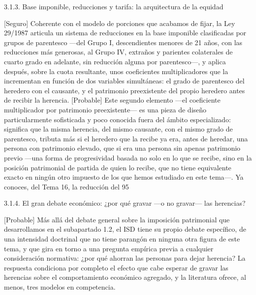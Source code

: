 \documentclass[10pt,a4paper]{article}
\begin{document}
3.1.3. Base imponible, reducciones y tarifa: la arquitectura de la equidad

[Seguro] Coherente con el modelo de porciones que acabamos de fijar, la Ley 29/1987 articula un sistema de reducciones en la base imponible clasificadas por grupos de parentesco —del Grupo I, descendientes menores de 21 años, con las reducciones más generosas, al Grupo IV, extraños y parientes colaterales de cuarto grado en adelante, sin reducción alguna por parentesco—, y aplica después, sobre la cuota resultante, unos coeficientes multiplicadores que la incrementan en función de dos variables simultáneas: el grado de parentesco del heredero con el causante, y el patrimonio preexistente del propio heredero antes de recibir la herencia. [Probable] Este segundo elemento —el coeficiente multiplicador por patrimonio preexistente— es una pieza de diseño particularmente sofisticada y poco conocida fuera del ámbito especializado: significa que la misma herencia, del mismo causante, con el mismo grado de parentesco, tributa más si el heredero que la recibe ya era, antes de heredar, una persona con patrimonio elevado, que si era una persona sin apenas patrimonio previo —una forma de progresividad basada no solo en lo que se recibe, sino en la posición patrimonial de partida de quien lo recibe, que no tiene equivalente exacto en ningún otro impuesto de los que hemos estudiado en este tema—. Ya conoces, del Tema 16, la reducción del 95%

3.1.4. El gran debate económico: ¿por qué gravar —o no gravar— las herencias?

[Probable] Más allá del debate general sobre la imposición patrimonial que desarrollamos en el subapartado 1.2, el ISD tiene su propio debate específico, de una intensidad doctrinal que no tiene parangón en ninguna otra figura de este tema, y que gira en torno a una pregunta empírica previa a cualquier consideración normativa: ¿por qué ahorran las personas para dejar herencia? La respuesta condiciona por completo el efecto que cabe esperar de gravar las herencias sobre el comportamiento económico agregado, y la literatura ofrece, al menos, tres modelos en competencia.
\end{document}
